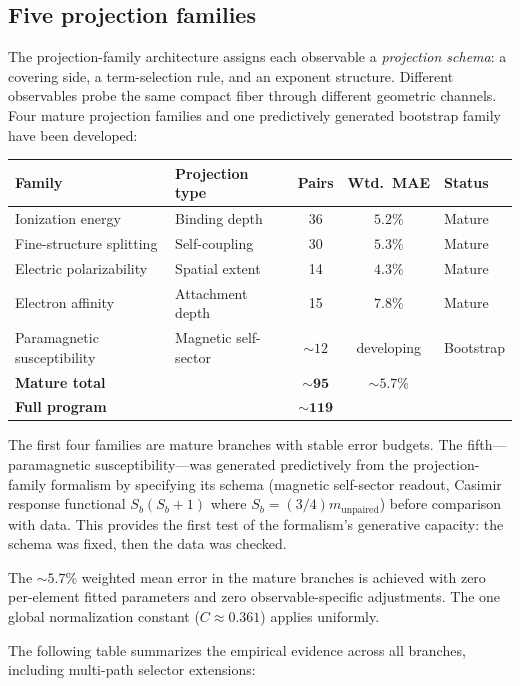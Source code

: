 \documentclass[11pt,a4paper]{article}
\begin{document}
\subsection{Five projection families}

The projection-family architecture assigns each observable a \emph{projection schema}: a covering side, a term-selection rule, and an exponent structure. Different observables probe the same compact fiber through different geometric channels. Four mature projection families and one predictively generated bootstrap family have been developed:

\begin{center}
\renewcommand{\arraystretch}{1.15}
\begin{tabular}{llccl}
\toprule
Family & Projection type & Pairs & Wtd.\ MAE & Status \\
\midrule
Ionization energy & Binding depth & 36 & $5.2\%$ & Mature \\
Fine-structure splitting & Self-coupling & 30 & $5.3\%$ & Mature \\
Electric polarizability & Spatial extent & 14 & $4.3\%$ & Mature \\
Electron affinity & Attachment depth & 15 & $7.8\%$ & Mature \\
Paramagnetic susceptibility & Magnetic self-sector & $\sim 12$ & developing & Bootstrap \\
\midrule
\textbf{Mature total} & & $\mathbf{\sim 95}$ & $\mathbf{\sim 5.7\%}$ & \\
\textbf{Full program} & & $\mathbf{\sim 119}$ & & \\
\bottomrule
\end{tabular}
\end{center}

The first four families are mature branches with stable error budgets. The fifth---paramagnetic susceptibility---was generated predictively from the projection-family formalism by specifying its schema (magnetic self-sector readout, Casimir response functional $S_b(S_b + 1)$ where $S_b = (3/4)m_{\mathrm{unpaired}}$) before comparison with data. This provides the first test of the formalism's generative capacity: the schema was fixed, then the data was checked.

The ${\sim}5.7\%$ weighted mean error in the mature branches is achieved with zero per-element fitted parameters and zero observable-specific adjustments. The one global normalization constant ($C \approx 0.361$) applies uniformly.

The following table summarizes the empirical evidence across all branches, including multi-path selector extensions:
\end{document}
